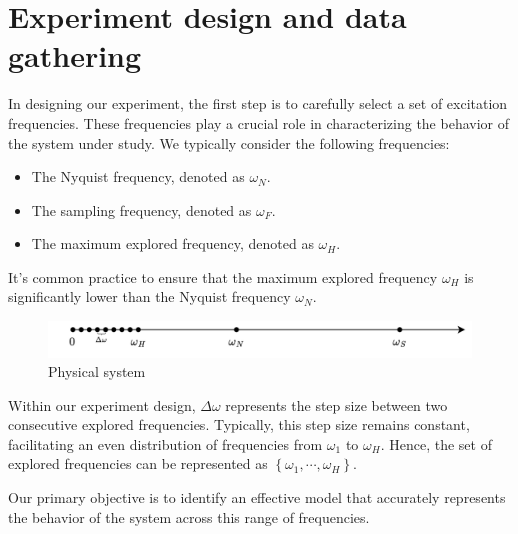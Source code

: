 \section{Experiment design and data gathering}

In designing our experiment, the first step is to carefully select a set of excitation frequencies. 
These frequencies play a crucial role in characterizing the behavior of the system under study. 
We typically consider the following frequencies:
\begin{itemize}
    \item The Nyquist frequency, denoted as $\omega_N$.
    \item The sampling frequency, denoted as $\omega_F$.
    \item The maximum explored frequency, denoted as $\omega_H$.
\end{itemize}
It's common practice to ensure that the maximum explored frequency $\omega_H$ is significantly lower than the Nyquist frequency $\omega_N$.
\begin{figure}[H]
    \centering
    \includegraphics[width=1\linewidth]{images/experiment.png}
    \caption{Physical system}
\end{figure}
Within our experiment design, $\Delta\omega$ represents the step size between two consecutive explored frequencies. 
Typically, this step size remains constant, facilitating an even distribution of frequencies from $\omega_1$ to $\omega_H$. 
Hence, the set of explored frequencies can be represented as $\left\{\omega_1,\cdots,\omega_H\right\}$. 

Our primary objective is to identify an effective model that accurately represents the behavior of the system across this range of frequencies.

